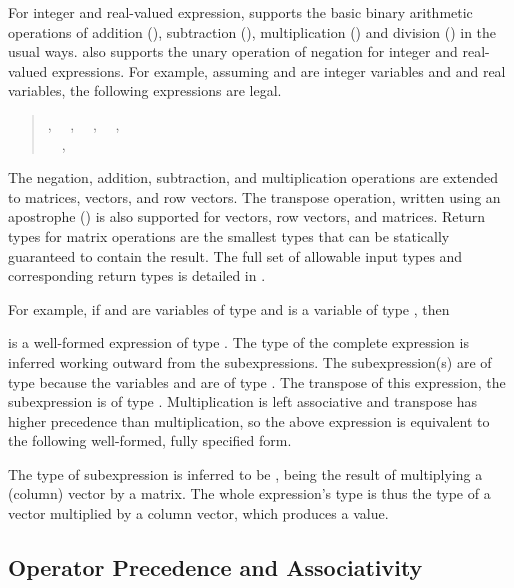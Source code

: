 For integer and real-valued expression, \Stan supports the basic
binary arithmetic operations of addition (\code{+}), subtraction
(\code{-}), multiplication (\code{*}) and division (\code{/}) in the
usual ways.  \Stan also supports the unary operation of negation for
integer and real-valued expressions.  For example, assuming 
and  are integer variables and  and  real
variables, the following expressions are legal.
\begin{quote}
, 
\ \ ,
\ \ , 
\ \ ,
\\
\ \ ,
\ \ 
\end{quote}
%
The negation, addition, subtraction, and multiplication operations are
extended to matrices, vectors, and row vectors.  The transpose
operation, written using an apostrophe () is also supported
for vectors, row vectors, and matrices.  Return types for matrix
operations are the smallest types that can be statically guaranteed to
contain the result.  The full set of allowable input types and
corresponding return types is detailed in
.

For example, if  and  are variables of type
 and  is a variable of type ,
then
%
\begin{quote}
\end{quote}
%
is a well-formed expression of type .  The type of the
complete expression is inferred working outward from the
subexpressions.  The subexpression(s)  are of type
 because the variables  and  are of type
.  The transpose of this expression, the subexpression
 is of type .  Multiplication is
left associative and transpose has higher precedence than
multiplication, so the above expression is equivalent to the following
well-formed, fully specified form.
%
\begin{quote}
\end{quote}
%
The type of subexpression  is inferred to be
, being the result of multiplying a (column) vector by a
matrix.  The whole expression's type is thus the type of a vector
multiplied by a column vector, which produces a  value.



\subsection{Operator Precedence and Associativity}

